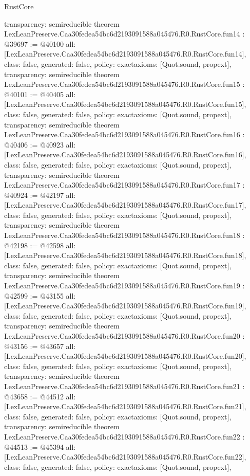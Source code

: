 \begin{lexlean}{RustCore}
\begin{coremodule}
{  transparency: semireducible
}
theorem LexLeanPreserve.Caa30fedea54bc6d2193091588a045476.R0.RustCore.fun14 : @39697 := @40100 {
  all: [LexLeanPreserve.Caa30fedea54bc6d2193091588a045476.R0.RustCore.fun14],
  class: false,
  generated: false,
  policy: exact{axioms: [Quot.sound, propext]},
  transparency: semireducible
}
theorem LexLeanPreserve.Caa30fedea54bc6d2193091588a045476.R0.RustCore.fun15 : @40101 := @40405 {
  all: [LexLeanPreserve.Caa30fedea54bc6d2193091588a045476.R0.RustCore.fun15],
  class: false,
  generated: false,
  policy: exact{axioms: [Quot.sound, propext]},
  transparency: semireducible
}
theorem LexLeanPreserve.Caa30fedea54bc6d2193091588a045476.R0.RustCore.fun16 : @40406 := @40923 {
  all: [LexLeanPreserve.Caa30fedea54bc6d2193091588a045476.R0.RustCore.fun16],
  class: false,
  generated: false,
  policy: exact{axioms: [Quot.sound, propext]},
  transparency: semireducible
}
theorem LexLeanPreserve.Caa30fedea54bc6d2193091588a045476.R0.RustCore.fun17 : @40924 := @42197 {
  all: [LexLeanPreserve.Caa30fedea54bc6d2193091588a045476.R0.RustCore.fun17],
  class: false,
  generated: false,
  policy: exact{axioms: [Quot.sound, propext]},
  transparency: semireducible
}
theorem LexLeanPreserve.Caa30fedea54bc6d2193091588a045476.R0.RustCore.fun18 : @42198 := @42598 {
  all: [LexLeanPreserve.Caa30fedea54bc6d2193091588a045476.R0.RustCore.fun18],
  class: false,
  generated: false,
  policy: exact{axioms: [Quot.sound, propext]},
  transparency: semireducible
}
theorem LexLeanPreserve.Caa30fedea54bc6d2193091588a045476.R0.RustCore.fun19 : @42599 := @43155 {
  all: [LexLeanPreserve.Caa30fedea54bc6d2193091588a045476.R0.RustCore.fun19],
  class: false,
  generated: false,
  policy: exact{axioms: [Quot.sound, propext]},
  transparency: semireducible
}
theorem LexLeanPreserve.Caa30fedea54bc6d2193091588a045476.R0.RustCore.fun20 : @43156 := @43657 {
  all: [LexLeanPreserve.Caa30fedea54bc6d2193091588a045476.R0.RustCore.fun20],
  class: false,
  generated: false,
  policy: exact{axioms: [Quot.sound, propext]},
  transparency: semireducible
}
theorem LexLeanPreserve.Caa30fedea54bc6d2193091588a045476.R0.RustCore.fun21 : @43658 := @44512 {
  all: [LexLeanPreserve.Caa30fedea54bc6d2193091588a045476.R0.RustCore.fun21],
  class: false,
  generated: false,
  policy: exact{axioms: [Quot.sound, propext]},
  transparency: semireducible
}
theorem LexLeanPreserve.Caa30fedea54bc6d2193091588a045476.R0.RustCore.fun22 : @44513 := @45394 {
  all: [LexLeanPreserve.Caa30fedea54bc6d2193091588a045476.R0.RustCore.fun22],
  class: false,
  generated: false,
  policy: exact{axioms: [Quot.sound, propext]},
}
\end{coremodule}
\end{lexlean}
